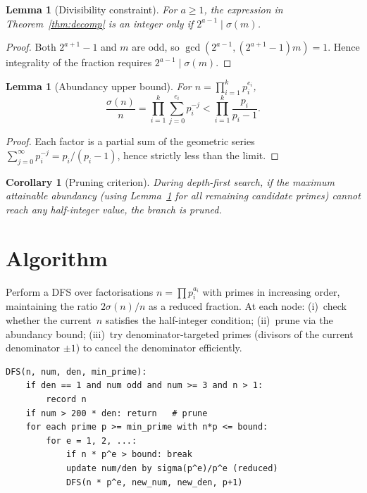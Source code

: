 \documentclass[12pt]{article}
\newtheorem{lemma}[theorem]{Lemma}
\newtheorem{corollary}[theorem]{Corollary}
\begin{document}
\begin{lemma}[Divisibility constraint]\label{lem:div}
For $a\ge 1$, the expression in Theorem~\ref{thm:decomp} is an integer only if $2^{a-1}\mid\sigma(m)$.
\end{lemma}

\begin{proof}
Both $2^{a+1}-1$ and $m$ are odd, so $\gcd(2^{a-1},(2^{a+1}-1)m)=1$. Hence integrality of the fraction requires $2^{a-1}\mid\sigma(m)$.
\end{proof}

\begin{lemma}[Abundancy upper bound]\label{lem:bound}
For $n=\prod_{i=1}^k p_i^{e_i}$,
\[
\frac{\sigma(n)}{n}=\prod_{i=1}^k\sum_{j=0}^{e_i}p_i^{-j}<\prod_{i=1}^k\frac{p_i}{p_i-1}.
\]
\end{lemma}

\begin{proof}
Each factor is a partial sum of the geometric series $\sum_{j=0}^{\infty}p_i^{-j}=p_i/(p_i-1)$, hence strictly less than the limit.
\end{proof}

\begin{corollary}[Pruning criterion]
During depth-first search, if the maximum attainable abundancy (using Lemma~\ref{lem:bound} for all remaining candidate primes) cannot reach any half-integer value, the branch is pruned.
\end{corollary}

\section{Algorithm}

Perform a DFS over factorisations $n=\prod p_i^{a_i}$ with primes in increasing order, maintaining the ratio $2\sigma(n)/n$ as a reduced fraction. At each node: (i)~check whether the current~$n$ satisfies the half-integer condition; (ii)~prune via the abundancy bound; (iii)~try denominator-targeted primes (divisors of the current denominator $\pm 1$) to cancel the denominator efficiently.

\begin{verbatim}
DFS(n, num, den, min_prime):
    if den == 1 and num odd and num >= 3 and n > 1:
        record n
    if num > 200 * den: return   # prune
    for each prime p >= min_prime with n*p <= bound:
        for e = 1, 2, ...:
            if n * p^e > bound: break
            update num/den by sigma(p^e)/p^e (reduced)
            DFS(n * p^e, new_num, new_den, p+1)
\end{verbatim}
\end{document}
